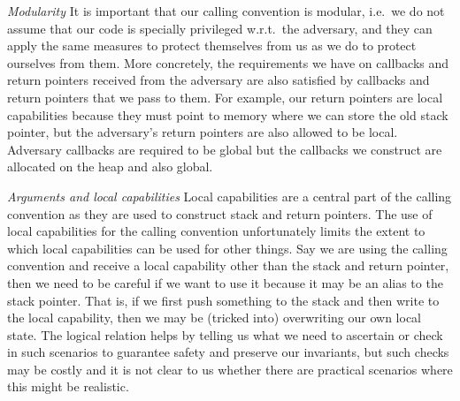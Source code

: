 \documentclass[format=acmsmall, review=true, screen=true]{acmart}
\begin{document}

\emph{Modularity} It is important that our calling convention is modular, i.e.\
we do not assume that our code is specially privileged w.r.t.\ the adversary,
and they can apply the same measures to protect themselves from us as we do to
protect ourselves from them. More concretely, the requirements we have on
callbacks and return pointers received from the adversary are also satisfied by
callbacks and return pointers that we pass to them. For example, our return
pointers are local capabilities because they must point to memory where we can
store the old stack pointer, but the adversary's return pointers are also
allowed to be local. Adversary callbacks are required to be global but the
callbacks we construct are allocated on the heap and also global.

\emph{Arguments and local capabilities} 
Local capabilities are a central part of the calling convention as they are used
to construct stack and return pointers. The use of local capabilities for the
calling convention unfortunately limits the extent to which local capabilities
can be used for other things. Say we are using the calling convention and
receive a local capability other than the stack and return pointer, then we need
to be careful if we want to use it because it may be an alias to the stack
pointer. That is, if we first push something to the stack and then write to the
local capability, then we may be (tricked into) overwriting our own local state.
The logical relation helps by telling us what we need to ascertain or check in
such scenarios to guarantee safety and preserve our invariants, but such checks
may be costly and it is not clear to us whether there are practical scenarios
where this might be realistic.
\end{document}
